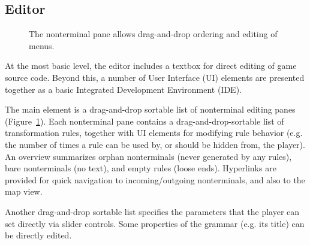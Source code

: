 \documentclass{acm_proc_article-sp}
\begin{document}
\subsection{Editor}

\begin{figure}
\caption{
\label{fig:editor}
The nonterminal pane allows drag-and-drop ordering and editing of menus.
}
\end{figure}

At the most basic level, the editor includes a textbox for direct editing of game source code.
Beyond this, a number of User Interface (UI)
elements are presented together as a basic Integrated Development Environment (IDE).

The main element is a drag-and-drop sortable list of nonterminal editing panes (Figure~\ref{fig:editor}).
Each nonterminal pane contains a drag-and-drop-sortable list of transformation rules,
together with UI elements for modifying rule behavior (e.g. the number of times
a rule can be used by, or should be hidden from, the player).
An overview summarizes orphan nonterminals (never generated by any rules),
bare nonterminals (no text), and empty rules (loose ends).
Hyperlinks are provided for quick navigation to incoming/outgoing nonterminals,
and also to the map view.

Another drag-and-drop sortable list specifies the parameters that the player
can set directly via slider controls.
Some properties of the grammar (e.g. its title) can be directly edited.
\end{document}
